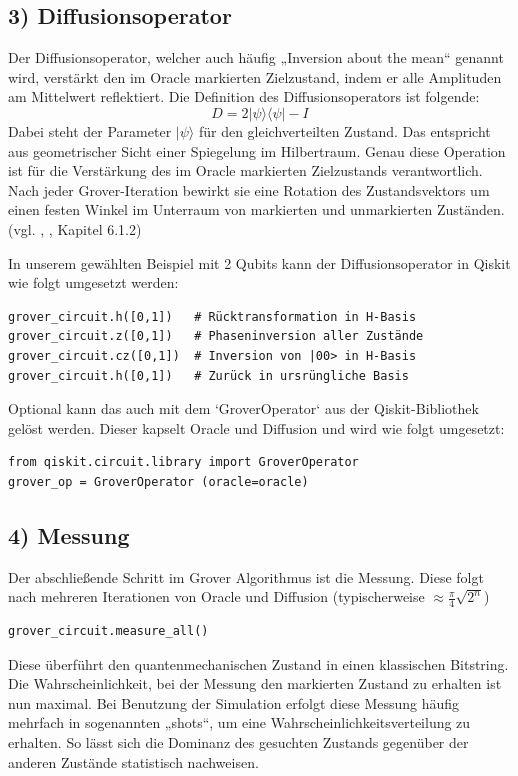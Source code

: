 \subsection*{3) Diffusionsoperator}
Der Diffusionsoperator, welcher auch häufig „Inversion about the mean“ genannt wird, verstärkt den im Oracle markierten Zielzustand, indem er alle Amplituden am Mittelwert reflektiert. Die Definition des Diffusionsoperators ist folgende:
$$
D = 2|\psi\rangle\langle\psi| - I
$$
Dabei steht der Parameter $|\psi\rangle$ für den gleichverteilten Zustand. Das entspricht aus geometrischer Sicht einer Spiegelung im Hilbertraum. Genau diese Operation ist für die Verstärkung des im Oracle markierten Zielzustands verantwortlich. Nach jeder Grover-Iteration bewirkt sie eine Rotation des Zustandsvektors um einen festen Winkel im Unterraum von markierten und unmarkierten Zuständen. (vgl. \citeauthor{nielsen_quantum_2010}, \citeyear{nielsen_quantum_2010}, Kapitel 6.1.2)

In unserem gewählten Beispiel mit 2 Qubits kann der Diffusionsoperator in Qiskit wie folgt umgesetzt werden:
\begin{verbatim}
grover_circuit.h([0,1])   # Rücktransformation in H-Basis
grover_circuit.z([0,1])   # Phaseninversion aller Zustände
grover_circuit.cz([0,1])  # Inversion von |00> in H-Basis
grover_circuit.h([0,1])   # Zurück in ursrüngliche Basis
\end{verbatim}

Optional kann das auch mit dem `GroverOperator` aus der Qiskit-Bibliothek gelöst werden. Dieser kapselt Oracle und Diffusion und wird wie folgt umgesetzt:
\begin{verbatim}
from qiskit.circuit.library import GroverOperator
grover_op = GroverOperator (oracle=oracle)
\end{verbatim}

\subsection*{4) Messung}
Der abschließende Schritt im Grover Algorithmus ist die Messung. Diese folgt nach mehreren Iterationen von Oracle und Diffusion (typischerweise $\approx \frac{\pi}{4} \sqrt{2^n}$)
\begin{verbatim}
grover_circuit.measure_all()
\end{verbatim}
Diese überführt den quantenmechanischen Zustand in einen klassischen Bitstring. 
Die Wahrscheinlichkeit, bei der Messung den markierten Zustand zu erhalten ist nun maximal. Bei Benutzung der Simulation erfolgt diese Messung häufig mehrfach in sogenannten „shots“, um eine Wahrscheinlichkeitsverteilung zu erhalten. So lässt sich die Dominanz des gesuchten Zustands gegenüber der anderen Zustände statistisch nachweisen.

